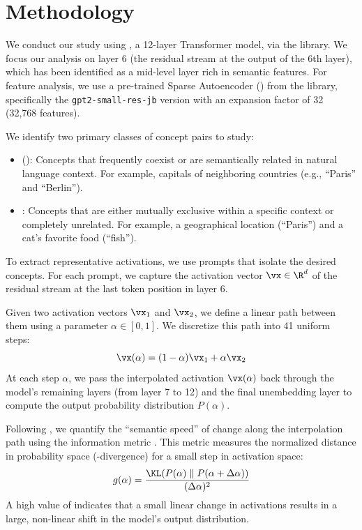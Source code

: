 \section{Methodology}

 We conduct our study using \gpttwo \cite{elhage2021mathematical}, a 12-layer Transformer model, via the \transformerlens library. We focus our analysis on layer 6 (the residual stream at the output of the 6th layer), which has been identified as a mid-level layer rich in semantic features. For feature analysis, we use a pre-trained Sparse Autoencoder (\sae) from the \saelens library, specifically the \texttt{gpt2-small-res-jb} version with an expansion factor of 32 (32,768 features).

 We identify two primary classes of concept pairs to study:
\begin{itemize}[leftmargin=*,itemsep=0pt,topsep=0pt]
    \item \congruent (\related): Concepts that frequently coexist or are semantically related in natural language context. For example, capitals of neighboring countries (e.g., ``Paris'' and ``Berlin'').
    \item \incongruent: Concepts that are either mutually exclusive within a specific context or completely unrelated. For example, a geographical location (``Paris'') and a cat's favorite food (``fish'').
\end{itemize}
To extract representative activations, we use prompts that isolate the desired concepts. For each prompt, we capture the activation vector $\vx \in \R^d$ of the residual stream at the last token position in layer 6.

 Given two activation vectors $\vx_1$ and $\vx_2$, we define a linear path between them using a parameter $\alpha \in [0, 1]$. We discretize this path into 41 uniform steps:
\begin{equation}
    \vx(\alpha) = (1 - \alpha)\vx_1 + \alpha \vx_2
\end{equation}
At each step $\alpha$, we pass the interpolated activation $\vx(\alpha)$ back through the model's remaining layers (from layer 7 to 12) and the final unembedding layer to compute the output probability distribution $P(\alpha)$.

 Following \citet{park2023linear}, we quantify the ``semantic speed'' of change along the interpolation path using the information metric \infometric. This metric measures the normalized distance in probability space (\kl-divergence) for a small step in activation space:
\begin{equation}
    \infometric = \frac{\KL(P(\alpha) \parallel P(\alpha + \Delta \alpha))}{(\Delta \alpha)^2}
\end{equation}
A high value of \infometric indicates that a small linear change in activations results in a large, non-linear shift in the model's output distribution.

